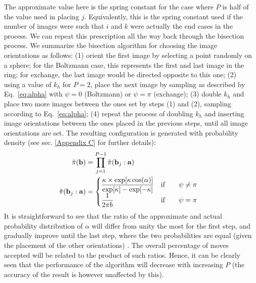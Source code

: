         The approximate value here is the spring constant for the case where $P$ is half of the value used in placing $j$. Equivalently, this is the spring constant used if the number of images were such that $i$ and $k$ were actually the end cases in the process. We can repeat this prescription all the way back through the bisection process. We summarize the bisection algorithm for choosing the image orientations as follows: (1) orient the first image by selecting a point randomly on a sphere; for the Boltzmann case, this represents the first and last image in the ring; for exchange, the last image would be directed opposite to this one; (2) using a value of $k_h$ for $P = 2$, place the next image by sampling as described by Eq.~\ref{eq:alpha} with $\psi = 0$ (Boltzmann) or $\psi = \pi$ (exchange); (3) double $k_h$ and place two more images between the ones set by steps (1) and (2), sampling according to Eq.~\ref{eq:alpha}; (4) repeat the process of doubling $k_h$ and inserting image orientations between the ones placed in the previous steps, until all image orientations are set. The resulting configuration is generated with probability density (see sec. \ref{Appendix C} for further details):
        \begin{equation}
        \label{eq:piTilde}
            \begin{aligned}
                \tilde \pi({\mathbf {b}}) &= \displaystyle\prod_{j=1}^{P-1} \tilde \pi({\mathbf {b}}_j: {\mathbf {a}}) \\
                \tilde \pi({\mathbf {b}}_j: {\mathbf {a}})  &=
                \begin{cases}
                    \displaystyle\frac{\kappa \times \exp[\kappa \cos (\alpha)]}{\exp[\kappa] - \exp[-\kappa]} & \text{if} \qquad \psi \ne \pi\\
                    \displaystyle\frac{1}{2 \pi b} & \text{if} \qquad \psi = \pi\\
                \end{cases}
            \end{aligned}
        \end{equation}
        It is straightforward to see that the ratio of the approximate and actual probability distribution of $\alpha$ will differ from unity the most for the first step, and gradually improve until the last step, where the two probabilities are equal (given the placement of the other orientations) . The overall percentage of moves accepted will be related to the product of such ratios. Hence, it can be clearly seen that the performance of the algorithm will decrease with increasing $P$ (the accuracy of the result is however unaffected by this).
